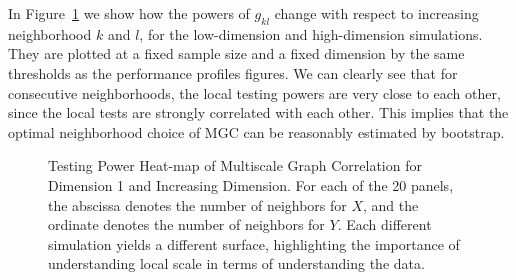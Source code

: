\documentclass[11pt]{article}
\begin{document}
In Figure~\ref{figSim2} we show how the powers of $g_{kl}$ change with respect to increasing neighborhood $k$ and $l$, for the low-dimension and high-dimension simulations. They are plotted at a fixed sample size and a fixed dimension by the same thresholds as the performance profiles figures. We can clearly see that for consecutive neighborhoods, the local testing powers are very close to each other, since the local tests are strongly correlated with each other. This implies that the optimal neighborhood choice of MGC can be reasonably estimated by bootstrap.

\begin{figure}[htbp]
\hfil
{}
\caption{Testing Power Heat-map of Multiscale Graph Correlation for Dimension 1 and Increasing Dimension.
For each of the 20 panels, the abscissa denotes the number of neighbors for $X$, and the ordinate denotes the number of neighbors for $Y$.  Each different simulation yields a different surface, highlighting the importance of understanding local scale in terms of understanding the data.}
\label{figSim2}
\end{figure}
\end{document}

